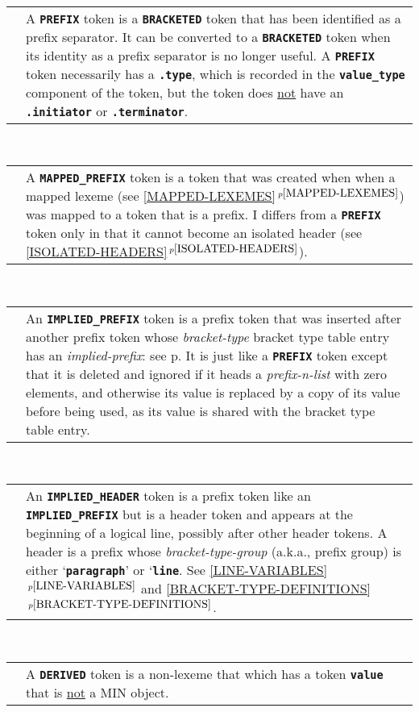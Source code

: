 \documentclass[12pt]{article}
\newcommand{\TT}[1]{{\tt \bfseries #1}}
\newcommand{\itemref}[1]{\ref{#1}$\,^{p\pageref{#1}}$}
\newcommand{\pagref}[1]{p\pageref{#1}}
\newcommand{\EOL}{\penalty \exhyphenpenalty}
\newenvironment{indpar}[1][0.3in]%
	{\begin{list}{}%
		     {\setlength{\itemsep}{0in}%
		      \setlength{\topsep}{0in}%
		      \setlength{\parsep}{1ex}%
		      \setlength{\labelwidth}{#1}%
		      \setlength{\leftmargin}{#1}%
		      \addtolength{\leftmargin}{\labelsep}}%
	 \item}%
	{\end{list}}
\begin{document}
\begin{indpar}
\\[1ex]
\begin{tabular}{p{1in}p{4.5in}}
		& A \TT{PREFIX} token is a
		  \TT{BRACKETED} token that has
		  been identified as a prefix separator.  It can be
		  converted to a \TT{BRACKETED} token when its identity
		  as a prefix separator is no longer useful.
		  A \TT{PREFIX} token necessarily has a \TT{.type},
		  which is recorded in
		  the \TT{value\_type} component of the token,
		  but the token does \underline{not} have an \TT{.initiator}
		  or \TT{.terminator}.
\end{tabular}
\\[1ex]
\begin{tabular}{p{1in}p{4.5in}}
		& A \TT{MAPPED\_PREFIX} token is a
		  token that was created when when a mapped lexeme
		  (see \itemref{MAPPED-LEXEMES})
		  was mapped to a token that is a prefix.  I differs
		  from a \TT{PREFIX} token only in that it cannot
		  become an isolated header (see \itemref{ISOLATED-HEADERS}).
\end{tabular}
\\[1ex]
\begin{tabular}{p{1in}p{4.5in}}
		& An \TT{IMPLIED\_PREFIX} token is a prefix token that
		  was inserted after another prefix token whose
		  {\em bracket-\EOL type} bracket type table entry has an
		  {\em implied-\EOL prefix}: see
		  \pagref{IMPLIED-PREFIX}.
		  It is just like
		  a \TT{PREFIX} token except that it is deleted and
		  ignored if it heads a {\em prefix-n-list} with zero
		  elements, and otherwise its value is replaced by a
		  copy of its value before being used, as its value is
		  shared with the bracket type table entry.
\end{tabular}
\\[1ex]
\begin{tabular}{p{1in}p{4.5in}}
		& An \TT{IMPLIED\_HEADER} token is a prefix token like an
		  \TT{IMPLIED\_\EOL PREFIX} but is a header token
		  and appears at the beginning of a logical line,
		  possibly after other header tokens.  A header
		  is a prefix whose {\em bracket-\EOL type-\EOL group}
		  (a.k.a., prefix group) is
		  either `\TT{paragraph}' or `\TT{line}.
                  See \itemref{LINE-VARIABLES} and
		  \itemref{BRACKET-TYPE-DEFINITIONS}.
\end{tabular}
\\[1ex]
\begin{tabular}{p{1in}p{4.5in}}
		& A \TT{DERIVED} token is a non-lexeme that which has
		  a token \TT{value} that is \underline{not} a MIN object.

\end{tabular}
\end{indpar}
\end{document}
